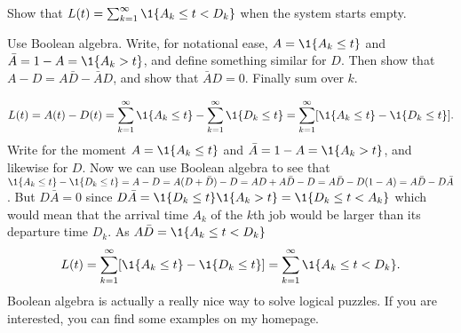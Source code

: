 \begin{exercise}\label{ex:l-151}
 Show  that $\L(t) = \sum_{k=1}^\infty \1{A_k \leq t < D_k}$ when the system starts empty.
\begin{hint}
 Use Boolean algebra.
 Write, for notational ease, $A=\1{A_k \leq t}$ and $\bar A = 1- A = \1{A_k > t}$, and define something similar for $D$.
 Then show that $A - D = A \bar D - \bar A D$, and show that $\bar A D =0$.
 Finally sum over $k$.
\end{hint}
\begin{solution}
 \begin{equation*}
 \L(t)
= A(t) - D(t) = \sum_{k=1}^\infty \1{A_k \leq t} - \sum_{k=1}^\infty \1{D_k \leq t}
= \sum_{k=1}^\infty [\1{A_k \leq t} - \1{D_k \leq t}].
 \end{equation*}
 Write for the moment $A=\1{A_k \leq t}$ and
 $\bar A = 1- A = \1{A_k > t}$, and likewise for $D$. Now we can use
 Boolean algebra to see that
 $\1{A_k \leq t} - \1{D_k \leq t} = A-D = A(D+\bar D) -D = AD +
 A\bar D - D = A\bar D - D(1-A) = A\bar D - D \bar A$.
 But $D \bar A = 0$ since
 $D \bar A = \1{D_k \leq t} \1{A_k > t} = \1{D_k \leq t < A_k}$
 which would mean that the arrival time $A_k$ of the $k$th job would
 be larger than its departure time $D_k$. As $A \bar D = \1{A_k \leq t < D_k}$
 \begin{equation*}
 \L(t)
= \sum_{k=1}^\infty [\1{A_k \leq t} - \1{D_k \leq t}]
= \sum_{k=1}^\infty \1{A_k \leq t < D_k}.
 \end{equation*}
 Boolean algebra is actually a really nice way to solve logical puzzles.
 If you are interested, you can find some examples on my homepage.
\end{solution}
\end{exercise}

